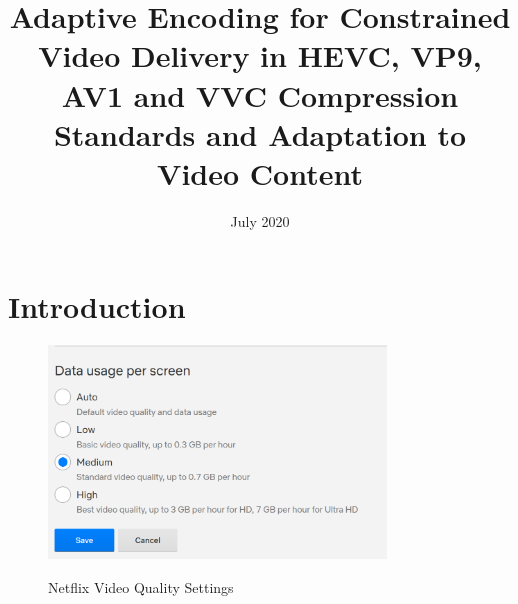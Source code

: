 \documentclass{book}
\begin{document}
\frontmatter

\title{ Adaptive Encoding for Constrained Video Delivery in HEVC, VP9, AV1 and VVC Compression Standards and
	Adaptation to Video Content}



\date{July 2020}

\maketitle

\mainmatter

%
%
\chapter{Introduction}
\label{ch1}

\begin{figure}[hbt!]
	\centering
	{\includegraphics[width=0.80\textwidth]{pictures/ch1/Netflix_Video_Quality_settings.png}
		\label{fig:netflix_video}}
		\caption{Netflix Video Quality Settings}
\end{figure}
\newpage



%
%
\end{document}
